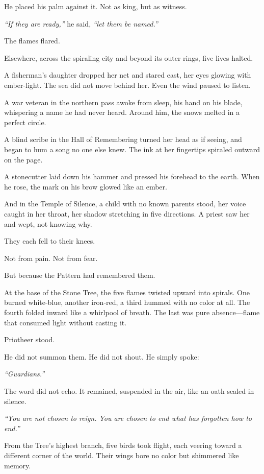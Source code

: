 \documentclass[12pt]{article}
\begin{document}
He placed his palm against it. Not as king, but as witness.

\emph{``If they are ready,''} he said, \emph{``let them be named.''}

The flames flared.

Elsewhere, across the spiraling city and beyond its outer rings, five lives halted.

A fisherman's daughter dropped her net and stared east, her eyes glowing with ember-light. The sea did not move behind her. Even the wind paused to listen.

A war veteran in the northern pass awoke from sleep, his hand on his blade, whispering a name he had never heard. Around him, the snows melted in a perfect circle.

A blind scribe in the Hall of Remembering turned her head as if seeing, and began to hum a song no one else knew. The ink at her fingertips spiraled outward on the page.

A stonecutter laid down his hammer and pressed his forehead to the earth. When he rose, the mark on his brow glowed like an ember.

And in the Temple of Silence, a child with no known parents stood, her voice caught in her throat, her shadow stretching in five directions. A priest saw her and wept, not knowing why.

They each fell to their knees.

Not from pain. Not from fear.

But because the Pattern had remembered them.

At the base of the Stone Tree, the five flames twisted upward into spirals. One burned white-blue, another iron-red, a third hummed with no color at all. The fourth folded inward like a whirlpool of breath. The last was pure absence—flame that consumed light without casting it.

Priotheer stood.

He did not summon them. He did not shout. He simply spoke:

\emph{``Guardians.''}

The word did not echo. It remained, suspended in the air, like an oath sealed in silence.

\emph{``You are not chosen to reign. You are chosen to end what has forgotten how to end.''}

From the Tree’s highest branch, five birds took flight, each veering toward a different corner of the world. Their wings bore no color but shimmered like memory.
\end{document}
